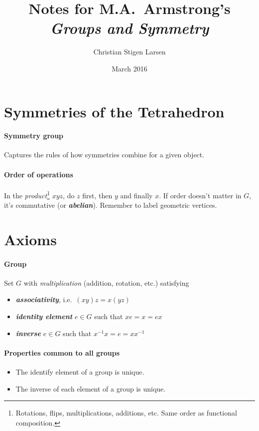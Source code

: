 \documentclass[a4paper,twocolumn,10pt]{article}
\title{Notes for M.A.~Armstrong's \textit{Groups and Symmetry}}
\author{Christian Stigen Larsen}
\date{March 2016}
\begin{document}
  \maketitle
  \section{Symmetries of the Tetrahedron}
  \paragraph{Symmetry group} Captures the rules of how symmetries combine for a
  given object.

  \paragraph{Order of operations} In the \textit{product}\footnote{Rotations,
  flips, multiplications, additions, etc. Same order as functional
  composition.} $xyz$, do $z$ first, then $y$ and finally $x$. If order doesn't
  matter in $G$, it's commutative (or \textbf{\textit{abelian}}). Remember to
  label geometric vertices.

  \section{Axioms}
  \paragraph{Group}  Set $G$ with \textit{multiplication} (addition,
  rotation, etc.) satisfying
  \begin{itemize}
    \item \textbf{\textit{associativity}}, i.e.~$(xy)z = x(yz)$
    \item \textbf{\textit{identity element}} $e \in G$ such that $xe=x=ex$
    \item \textbf{\textit{inverse}} $e \in G$ such that $x^{-1}x=e=xx^{-1}$
  \end{itemize}

  \paragraph{Properties common to all groups}
  \begin{itemize}
    \item The identify element of a group is unique.
    \item The inverse of each element of a group is unique.
  \end{itemize}
\end{document}
